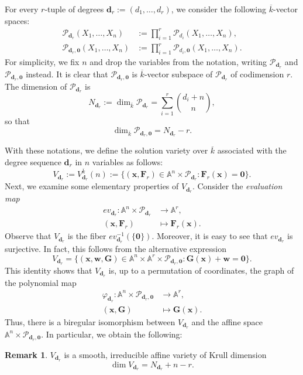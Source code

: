 \documentclass[pdflatex,sn-basic]{sn-jnl}%
\theoremstyle{thmstyleone}%
\theoremstyle{thmstyletwo}%
\theoremstyle{thmstylethree}%
\theoremstyle{definition}
\newtheorem{remark}[theorem]{Remark}
\numberwithin{equation}{section}
\newcommand{\bfs}{\boldsymbol}
\newcommand{\A}{\mathbb A}
\begin{document}
For every $r$-tuple of degrees $\bfs d_r:=(d_1,\ldots,d_r)$, we
consider the following $\overline{k}$-vector spaces:
%
\begin{align*}
\mathcal{P}_{\bfs d_r}(X_1,\ldots,X_n) &:=
\prod_{i=1}^r\mathcal{P}_{d_i}(X_1,\ldots,X_n), \\
\mathcal{P}_{\bfs d_r,\bfs 0}(X_1,\ldots,X_n) &:=
\prod_{i=1}^r\mathcal{P}_{d_i,\bfs 0}(X_1,\ldots,X_n).
\end{align*}
%
For simplicity, we fix $n$ and drop the variables from the notation,
writing $\mathcal{P}_{\bfs d_r}$ and $\mathcal{P}_{\bfs d_r,\bfs 0}$
instead. It is clear that $\mathcal{P}_{\bfs d_r,\bfs 0}$ is
$\overline{k}$-vector subspace of $\mathcal{P}_{\bfs d_r}$ of
codimension $r$. The dimension of $\mathcal{P}_{\bfs d_r}$ is
%
$$N_{\bfs d_r}:=\dim_{\overline{k}}\mathcal{P}_{\bfs d_r}=
\sum_{i=1}^{r}\binom{d_i+n}{n},$$
%
so that
%
$$\dim_{\overline{k}}\mathcal{P}_{\bfs d_r,\bfs 0}=N_{\bfs d_r}-r.$$

With these notations, we define the solution variety over
$\overline{k}$ associated with the degree sequence $\bfs d_r$ in $n$
variables as follows:
%
$$V_{\bfs d_r}:=V_{\bfs d_r}^{\overline{k}}(n):=
\{(\bfs x,\bfs F_r)\in\A^n\times \mathcal{P}_{\bfs d_r}: \bfs
F_r(\bfs x)=\bfs 0\}.$$
%
Next, we examine some elementary properties of $V_{\bfs d_r}$.
Consider the {\em evaluation map}
%
\begin{align*}
  ev_{\bfs d_r}:\A^n\times\mathcal{P}_{\bfs d_r} &\to \A^r, \\
  (\bfs x, \bfs F_r) & \mapsto \bfs F_r(\bfs x).
\end{align*}
%
Observe that $V_{\bfs d_r}$ is the fiber $ev_{\bfs d_r}^{-1}(\{\bfs
0\})$. Moreover, it is easy to see that $ev_{\bfs d_r}$ is
surjective. In fact, this follows from the alternative expression
%
$$V_{\bfs d_r}=\{(\bfs x,\bfs w,\bfs G)\in\A^n\times\A^r\times\mathcal{P}_{\bfs d_r,\bfs 0}:
\bfs G(\bfs x)+\bfs w=\bfs 0\}.$$
%
This identity shows that $V_{\bfs d_r}$ is, up to a permutation of
coordinates, the graph of the polynomial map
%
\begin{align*}
  \varphi_{\bfs d_r}:\A^n\times\mathcal{P}_{\bfs d_r,\bfs 0} & \to\A^r, \\
  (\bfs x,\bfs G) & \mapsto \bfs G(\bfs x).
\end{align*}
%
Thus, there is a biregular isomorphism between $V_{\bfs d_r}$ and
the affine space $\A^n\times \mathcal{P}_{\bfs d_r,\bfs 0}$. In
particular, we obtain the following:
%
\begin{remark}
$V_{\bfs d_r}$ is a smooth, irreducible affine variety of Krull dimension
%
$$\dim V_{\bfs d_r}=N_{\bfs d_r}+n-r.$$
\end{remark}
\end{document}
